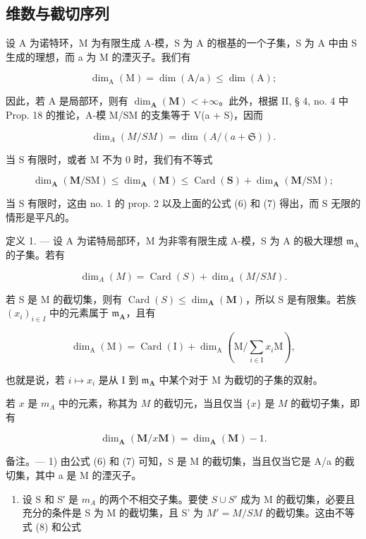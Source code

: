 \subsection{维数与截切序列}

设 A 为诺特环，M 为有限生成 A-模，S 为 A 的根基的一个子集，S 为 A 中由 S 生成的理想，而 a 为 M 的湮灭子。我们有

\[
\dim_ {\mathrm{A}} (\mathrm{M}) = \dim (\mathrm{A} / \mathrm{a}) \leqslant \dim (\mathrm{A});\tag{6}
\]

因此，若 A 是局部环，则有 \(\dim_{\mathbf{A}}(\mathbf{M}) < +\infty\)。此外，根据 II, § 4, no. 4 中 Prop. 18 的推论，A-模 M/SM 的支集等于 V(a + S)，因而

\[
\dim_ {A} (M / S M) = \dim (A / (a + \mathfrak {S}))  .\tag{7}
\]

当 S 有限时，或者 M 不为 0 时，我们有不等式

\[
\dim_ {\mathbf {A}} (\mathbf {M} / \mathrm{SM}) \leqslant \dim_ {\mathbf {A}} (\mathbf {M}) \leqslant \operatorname{Card} (\mathbf {S}) + \dim_ {\mathbf {A}} (\mathbf {M} / \mathrm{SM});\tag{8}
\]

当 S 有限时，这由 no. 1 的 prop. 2 以及上面的公式 (6) 和 (7) 得出，而 S 无限的情形是平凡的。

定义 1. --- 设 A 为诺特局部环，M 为非零有限生成 A-模，S 为 A 的极大理想 \(\mathfrak{m}_{\mathrm{A}}\) 的子集。若有

\[
\dim_ {A} (M) = \operatorname{Card} (S) + \dim_ {A} (M / S M).\tag{9}
\]

若 S 是 M 的截切集，则有 \(\operatorname{Card}(S) \leqslant \dim_{\mathbf{A}}(\mathbf{M})\)，所以 S 是有限集。若族 \((x_i)_{i \in I}\) 中的元素属于 \(\mathfrak{m}_{\mathbf{A}}\)，且有

\[
\dim_ {\mathrm{A}} (\mathrm{M}) = \operatorname{Card} (\mathrm{I}) + \dim_ {\mathrm{A}} \left(\mathrm{M} / \sum_ {i \in \mathrm{I}} x _ {i} \mathrm{M}\right),\tag{10}
\]

也就是说，若 \(i\mapsto x_{i}\) 是从 I 到 \(\mathfrak{m}_{\mathbf{A}}\) 中某个对于 M 为截切的子集的双射。

若 \(x\) 是 \(m_A\) 中的元素，称其为 \(M\) 的截切元，当且仅当 \(\{x\}\) 是 \(M\) 的截切子集，即有

\[
\dim_ {\mathbf {A}} (\mathbf {M} / x \mathbf {M}) = \dim_ {\mathbf {A}} (\mathbf {M}) - 1.
\]

备注。--- 1) 由公式 (6) 和 (7) 可知，S 是 M 的截切集，当且仅当它是 A/a 的截切集，其中 a 是 M 的湮灭子。

\begin{enumerate}
\def\labelenumi{\arabic{enumi})}
\setcounter{enumi}{1}
\tightlist
\item
  设 S 和 S′ 是 \(m_{A}\) 的两个不相交子集。要使 \(S \cup S'\) 成为 M 的截切集，必要且充分的条件是 S 为 M 的截切集，且 S' 为 \(M' = M/SM\) 的截切集。这由不等式 (8) 和公式
\end{enumerate}

